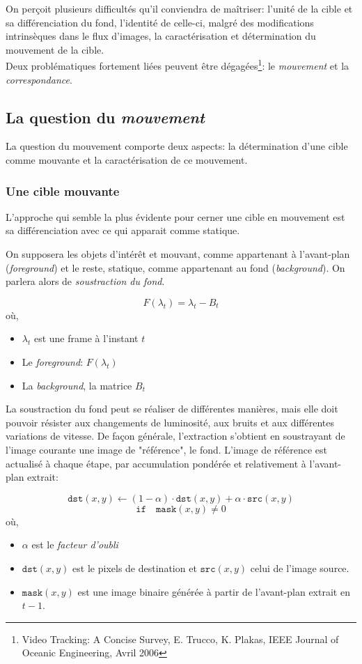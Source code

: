 \documentclass[a4paper,12pt]{report}
\begin{document}
On perçoit plusieurs difficultés qu'il conviendra de maîtriser: l'unité de la cible et sa différenciation du fond, l'identité de celle-ci, malgré des modifications intrinsèques dans le flux d'images, la caractérisation et détermination du mouvement de la cible.\\
Deux problématiques fortement liées peuvent être dégagées\footnote{Video Tracking: A Concise Survey, E. Trucco, K. Plakas, IEEE Journal of Oceanic Engineering, Avril 2006}: le \textit{mouvement} et la \textit{correspondance}.

\subsection{La question du \textit{mouvement}}

	La question du mouvement comporte deux aspects: la détermination d'une cible comme mouvante et la caractérisation de ce mouvement.
	
\subsubsection{Une cible mouvante}	
	L'approche qui semble la plus évidente pour cerner une cible en mouvement est sa différenciation avec ce qui apparait comme statique. 
	
	On supposera les objets d'intérêt et mouvant, comme appartenant à l'avant-plan (\textit{foreground}) et le reste, statique, comme appartenant au fond (\textit{background}). On parlera alors de \textit{soustraction du fond}.

\[F(\lambda_t) = \lambda_t - B_t\]	
où,
\begin{itemize}
\item[] $\lambda_t$ est une frame à l'instant $t$
\item[] Le \textit{foreground}: $F(\lambda_t)$ 
\item[] La \textit{background}, la matrice $B_t$\\
\end{itemize}

	La soustraction du fond peut se réaliser de différentes manières, mais elle doit pouvoir résister aux changements de luminosité, aux bruits et aux différentes variations de vitesse.
	De façon générale, l'extraction s'obtient en soustrayant de l'image courante une image de "référence", le fond.
	L'image de référence est actualisé à chaque étape, par accumulation pondérée et relativement à l'avant-plan extrait:
	
	$$\texttt{dst}(x,y)  \leftarrow (1- \alpha )  \cdot \texttt{dst}(x,y)+\alpha \cdot \texttt{src}(x,y)$$
	$$\texttt{if} \quad \texttt{mask} (x,y)  \ne 0$$
	où,	
	\begin{itemize}
	\item[] $\alpha$ est le \textit{facteur d'oubli}
	\item[] $\texttt{dst}(x,y)$ est le pixels de destination et $\texttt{src}(x,y)$ celui de l'image source.
	\item[] $\texttt{mask} (x,y)$ est une image binaire générée à partir de l'avant-plan extrait en $t-1$.
	\end{itemize}
\end{document}
